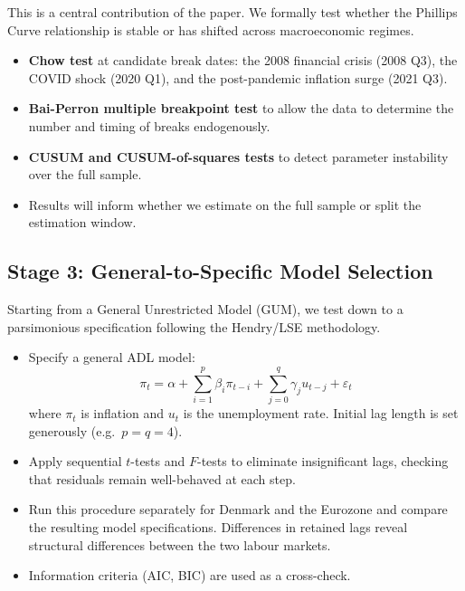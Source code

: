 This is a central contribution of the paper. We formally test whether the
Phillips Curve relationship is stable or has shifted across macroeconomic
regimes.

\begin{itemize}[nosep]
    \item \textbf{Chow test} at candidate break dates: the 2008 financial
          crisis (2008 Q3), the COVID shock (2020 Q1), and the post-pandemic
          inflation surge (2021 Q3).
    \item \textbf{Bai-Perron multiple breakpoint test} to allow the data to
          determine the number and timing of breaks endogenously.
    \item \textbf{CUSUM and CUSUM-of-squares tests} to detect parameter
          instability over the full sample.
    \item Results will inform whether we estimate on the full sample or split
          the estimation window.
\end{itemize}

\subsection{Stage 3: General-to-Specific Model Selection}

Starting from a General Unrestricted Model (GUM), we test down to a
parsimonious specification following the Hendry/LSE methodology.

\begin{itemize}[nosep]
    \item Specify a general ADL model:
          \[
          \pi_t = \alpha + \sum_{i=1}^{p} \beta_i \pi_{t-i}
                  + \sum_{j=0}^{q} \gamma_j u_{t-j} + \varepsilon_t
          \]
          where $\pi_t$ is inflation and $u_t$ is the unemployment rate.
          Initial lag length is set generously (e.g.\ $p = q = 4$).
    \item Apply sequential $t$-tests and $F$-tests to eliminate insignificant
          lags, checking that residuals remain well-behaved at each step.
    \item Run this procedure separately for Denmark and the Eurozone and
          compare the resulting model specifications. Differences in retained
          lags reveal structural differences between the two labour markets.
    \item Information criteria (AIC, BIC) are used as a cross-check.
\end{itemize}

